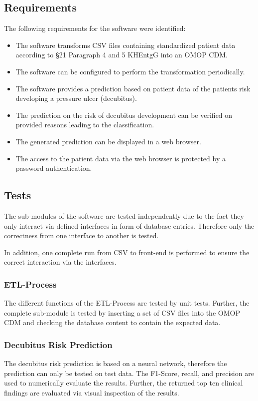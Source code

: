 \subsection{Requirements}
The following requirements for the software were identified:
\begin{itemize}
    \item The software transforms CSV files containing standardized patient data according to §21 Paragraph 4 and 5 KHEntgG into an OMOP CDM.
    \item The software can be configured to perform the transformation periodically.
    \item The software provides a prediction based on patient data of the patients risk developing a pressure ulcer (decubitus).
    \item The prediction on the risk of decubitus development can be verified on provided reasons leading to the classification.
    \item The generated prediction can be displayed in a web browser.
    \item The access to the patient data via the web browser is protected by a password authentication.  
\end{itemize}

\subsection{Tests}
The sub-modules of the software are tested independently due to the fact they only interact via defined interfaces in form of database entries.
Therefore only the correctness from one interface to another is tested.

In addition, one complete run from CSV to front-end is performed to ensure the correct interaction via the interfaces.

\subsubsection{ETL-Process}
The different functions of the ETL-Process are tested by unit tests.
Further, the complete sub-module is tested by inserting a set of CSV files into the OMOP CDM and checking the database content to contain the expected data.

\subsubsection{Decubitus Risk Prediction}
The decubitus risk prediction is based on a neural network, therefore the prediction can only be tested on test data. 
The F1-Score, recall, and precision are used to numerically evaluate the results.
Further, the returned top ten clinical findings are evaluated via visual inspection of the results. 

